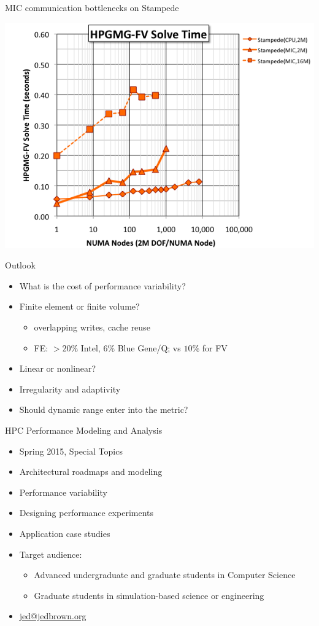 \documentclass{beamer}
\begin{document}
\begin{frame}{MIC communication bottlenecks on Stampede}
  \begin{center}
    \includegraphics[width=\textwidth]{figures/hpgmg/fv-mic-mpi.png}
  \end{center}
\end{frame}

\begin{frame}{Outlook}
  \begin{itemize}
  \item What is the cost of performance variability?
  \item Finite element or finite volume?
    \begin{itemize}
    \item overlapping writes, cache reuse
    \item FE: $>20\%$ Intel, $6\%$ Blue Gene/Q; vs $10\%$ for FV
    \end{itemize}
  \item Linear or nonlinear?
  \item Irregularity and adaptivity
  \item Should dynamic range enter into the metric?
  \end{itemize}
\end{frame}

\begin{frame}{HPC Performance Modeling and Analysis}
  \begin{itemize}
  \item Spring 2015, Special Topics
  \item Architectural roadmaps and modeling
  \item Performance variability
  \item Designing performance experiments
  \item Application case studies
  \item Target audience:
    \begin{itemize}
    \item Advanced undergraduate and graduate students in Computer Science
    \item Graduate students in simulation-based science or engineering
    \end{itemize}
  \item \url{jed@jedbrown.org}
  \end{itemize}
\end{frame}
\end{document}
